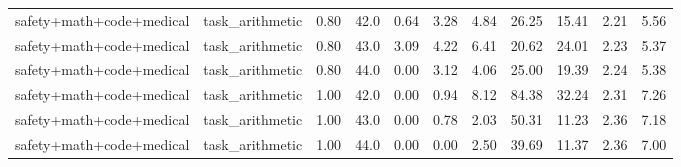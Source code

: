 \documentclass{article}
\begin{document}
\begin{table}[H]
{\begin{tabular}{llllrrrrrrr}
safety+math+code+medical & task\_arithmetic & 0.80 & 42.0 & 0.64 & 3.28 & 4.84 & 26.25 & 15.41 & 2.21 & 5.56 \\
safety+math+code+medical & task\_arithmetic & 0.80 & 43.0 & 3.09 & 4.22 & 6.41 & 20.62 & 24.01 & 2.23 & 5.37 \\
safety+math+code+medical & task\_arithmetic & 0.80 & 44.0 & 0.00 & 3.12 & 4.06 & 25.00 & 19.39 & 2.24 & 5.38 \\
safety+math+code+medical & task\_arithmetic & 1.00 & 42.0 & 0.00 & 0.94 & 8.12 & 84.38 & 32.24 & 2.31 & 7.26 \\
safety+math+code+medical & task\_arithmetic & 1.00 & 43.0 & 0.00 & 0.78 & 2.03 & 50.31 & 11.23 & 2.36 & 7.18 \\
safety+math+code+medical & task\_arithmetic & 1.00 & 44.0 & 0.00 & 0.00 & 2.50 & 39.69 & 11.37 & 2.36 & 7.00 \\
\bottomrule
\end{tabular}
}
\end{table}
\end{document}
